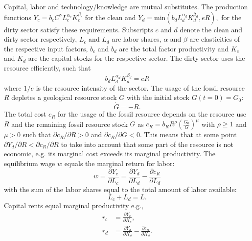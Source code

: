 Capital, labor and technology/knowledge are mutual substitutes. The production functions $Y_c = b_c C^{\gamma} L_c^{\alpha_c}K_c^{\beta_c}$  for the clean and 	$Y_d = \mathrm{ min}\left( b_d L_d^{\alpha_d}K_d^{\beta_d}, e R \right),$ for the dirty sector satisfy these requirements. Subscripts $c$ and $d$ denote the clean and dirty sector respectively, $L_c$ and $L_d$ are labor shares, $\alpha$ and $\beta$ are elasticities of the respective input factors, $b_c$ and $b_d$ are the total factor productivity and $K_c$ and $K_d$ are the capital stocks for the respective sector.
The dirty sector uses the resource efficiently, such that
\begin{equation}
    b_d L_d^{\alpha_d}K_d^{\beta_d} = e R
    \label{eq:approx_edr}
\end{equation}
where $1/e$ is the resource intensity of the sector. The usage of the fossil resource $R$ depletes a geological resource stock $G$ with the initial stock $G(t=0) = G_0$:
\begin{equation}
    \dot{G} = -R. 
    \label{eq:approx_rdep}
\end{equation} 
The total cost $c_R$ for the usage of the fossil resource depends on the resource use $R$ and the remaining fossil resource stock $G$ as $c_R = b_R R^{\rho}\left( \frac{G_0}{G} \right)^{\mu}$ with $\rho \geq 1$ and $\mu > 0$ such that $\partial c_R / \partial R >0$ and $\partial c_R / \partial G < 0$.
This means that at some point $\partial Y_d / \partial R < \partial c_R / \partial R$ to take into account that some part of the resource is not economic, e.g. its marginal cost exceeds its marginal productivity.
The equilibrium wage $w$ equals the marginal return for labor:
\begin{equation}
	w = \frac{\partial Y_c}{\partial L_c} = \frac{\partial Y_d}{\partial L_d} - \frac{\partial c_R}{\partial L_d}
	\label{eq:approx_equilibrium_wage}
\end{equation}
with the sum of the labor shares equal to the total amount of labor available:
\begin{equation}
	L_c + L_d = L.
	\label{eq:approx_L}
\end{equation}
Capital rents equal marginal productivity e.g., 
\begin{align}
  r_c &= \frac{\partial Y_c}{\partial K_c}, \label{eq:approx_ccr}\\
  r_d &= \frac{\partial Y_d}{\partial K_d} - \frac{\partial c_R}{\partial K_d}. \label{eq:approx_dcr}
\end{align}

